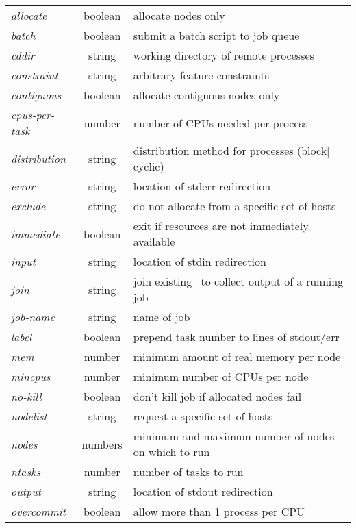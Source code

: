 \documentclass[10pt,onecolumn,times]{../common/llncs}
\begin{document}
{\begin{table}[!tb]
\begin{center}
\begin{tabular}[t]{lcl}
      {\em allocate}	   & boolean& allocate nodes only		      \\
      {\em batch}	   & boolean& submit a batch script to job queue      \\
      {\em cddir}	   & string & working directory of remote processes   \\
      {\em constraint}     & string & arbitrary feature constraints	      \\
      {\em contiguous}	   & boolean& allocate contiguous nodes only	      \\
      {\em cpus-per-task } & number & number of CPUs needed per process      \\
      {\em distribution}   & string & distribution method for processes (block$|$cyclic) \\
      {\em error}	   & string & location of stderr redirection	      \\
      {\em exclude}	   & string & do not allocate from a specific set of hosts \\
      {\em immediate}	   & boolean& exit if resources are not immediately available  \\
      {\em input}	   & string & location of stdin redirection	      \\
      {\em join}	   & string & join existing \srun\ to collect output of a running job \\
      {\em job-name}	   & string & name of job 			      \\
      {\em label}	   & boolean& prepend task number to lines of stdout/err \\
      {\em mem}		   & number & minimum amount of real memory per node  \\
      {\em mincpus} 	   & number & minimum number of CPUs per node         \\
      {\em no-kill}	   & boolean& don't kill job if allocated nodes fail  \\
      {\em nodelist}	   & string & request a specific set of hosts	      \\
      {\em nodes}	   & numbers& minimum and maximum number of nodes on which to run \\
      {\em ntasks}         & number & number of tasks to run     	      \\
      {\em output}         & string & location of stdout redirection	      \\
      {\em overcommit}     & boolean& allow more than 1 process per CPU	      \\

\end{tabular}
\end{center}
\end{table}}
\end{document}
